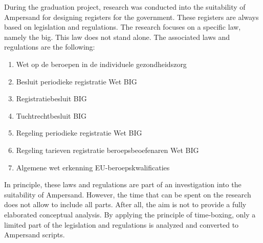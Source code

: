 During the graduation project, research was conducted into the suitability of Ampersand for designing registers for the government.
These registers are always based on legislation and regulations.
The research focuses on a specific law, namely the \acrshort{big}.
\newline
This law does not stand alone.
The associated laws and regulations are the following:
\begin{enumerate}
    \item Wet op de beroepen in de individuele gezondheidszorg
    \item Besluit periodieke registratie Wet BIG
    \item Registratiebesluit BIG
    \item Tuchtrechtbesluit BIG
    \item Regeling periodieke registratie Wet BIG
    \item Regeling tarieven registratie beroepsbeoefenaren Wet BIG
    \item Algemene wet erkenning EU-beroepskwalificaties
\end{enumerate} 
In principle, these laws and regulations are part of an investigation into the suitability of Ampersand.
However, the time that can be spent on the research does not allow to include all parts.
After all, the aim is not to provide a fully elaborated conceptual analysis.
By applying the principle of time-boxing, only a limited part of the legislation and regulations is analyzed and converted to Ampersand scripts.

